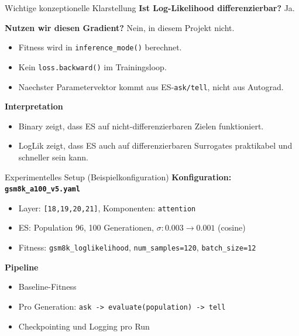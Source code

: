 \documentclass[aspectratio=169,11pt]{beamer}
\begin{document}
\begin{frame}{Wichtige konzeptionelle Klarstellung}
\textbf{Ist Log-Likelihood differenzierbar?} Ja.

\vspace{0.4em}
\textbf{Nutzen wir diesen Gradient?} Nein, in diesem Projekt nicht.
\begin{itemize}
  \item Fitness wird in \texttt{inference\_mode()} berechnet.
  \item Kein \texttt{loss.backward()} im Trainingsloop.
  \item Naechster Parametervektor kommt aus ES-\texttt{ask/tell}, nicht aus Autograd.
\end{itemize}

\vspace{0.5em}
\textbf{Interpretation}
\begin{itemize}
  \item Binary zeigt, dass ES auf nicht-differenzierbaren Zielen funktioniert.
  \item LogLik zeigt, dass ES auch auf differenzierbaren Surrogates praktikabel und schneller sein kann.
\end{itemize}
\end{frame}

\begin{frame}{Experimentelles Setup (Beispielkonfiguration)}
\textbf{Konfiguration: \texttt{gsm8k\_a100\_v5.yaml}}
\begin{itemize}
  \item Layer: \texttt{[18,19,20,21]}, Komponenten: \texttt{attention}
  \item ES: Population 96, 100 Generationen, $\sigma:0.003 \rightarrow 0.001$ (cosine)
  \item Fitness: \texttt{gsm8k\_loglikelihood}, \texttt{num\_samples=120}, \texttt{batch\_size=12}
\end{itemize}

\textbf{Pipeline}
\begin{itemize}
  \item Baseline-Fitness
  \item Pro Generation: \texttt{ask -> evaluate(population) -> tell}
  \item Checkpointing und Logging pro Run
\end{itemize}
\end{frame}
\end{document}
